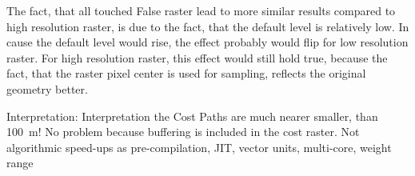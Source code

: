 The fact, that all touched False raster lead to more similar results compared to high resolution raster, is due to the fact, that the default level is relatively low.
In cause the default level would rise, the effect probably would flip for low resolution raster.
For high resolution raster, this effect would still hold true, because the fact, that the raster pixel center is used for sampling, reflects the original geometry better.


Interpretation: Interpretation the Cost Paths are much nearer smaller, than 100~m!
No problem because buffering is included in the cost raster.
Not algorithmic speed-ups as pre-compilation, JIT, vector units, multi-core, weight range